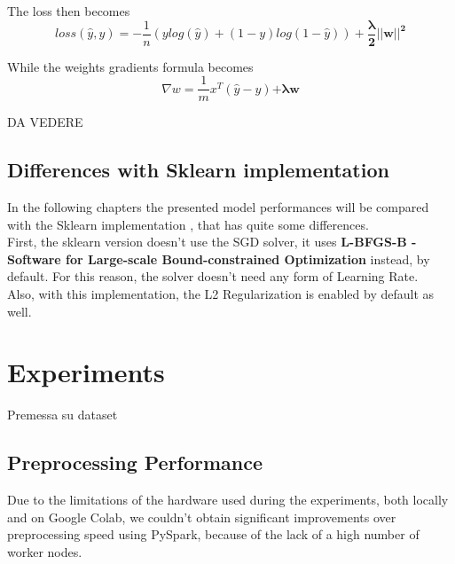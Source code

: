 \documentclass[
	letterpaper, %
	10pt, %
]{class}
\begin{document}
The loss then becomes
$$ loss(\hat{y}, y) = -\frac{1}{n}(y log(\hat{y}) + (1-y)log(1-\hat{y})) + \boldsymbol{\frac{\lambda}{2}||w||^2} $$

While the weights gradients formula becomes
$$ \nabla w = \frac{1}{m}x^T(\hat{y} - y) \boldsymbol{+ \lambda w} $$

DA VEDERE

\subsection{Differences with Sklearn implementation}

In the following chapters the presented model performances will be compared with the Sklearn implementation \cite{logistic_sklearn}, that has quite some differences.\\
First, the sklearn version doesn't use the SGD solver, it uses \textbf{L-BFGS-B - Software for Large-scale Bound-constrained Optimization} \cite{lbfgsb} instead, by default.
For this reason, the solver doesn't need any form of Learning Rate.\\
Also, with this implementation, the L2 Regularization is enabled by default as well.



\section{Experiments}

Premessa su dataset

\subsection{Preprocessing Performance}

Due to the limitations of the hardware used during the experiments, both locally and on Google Colab, we couldn't obtain significant improvements over preprocessing speed using PySpark, because of the lack of a high number of worker nodes.\\
\end{document}
